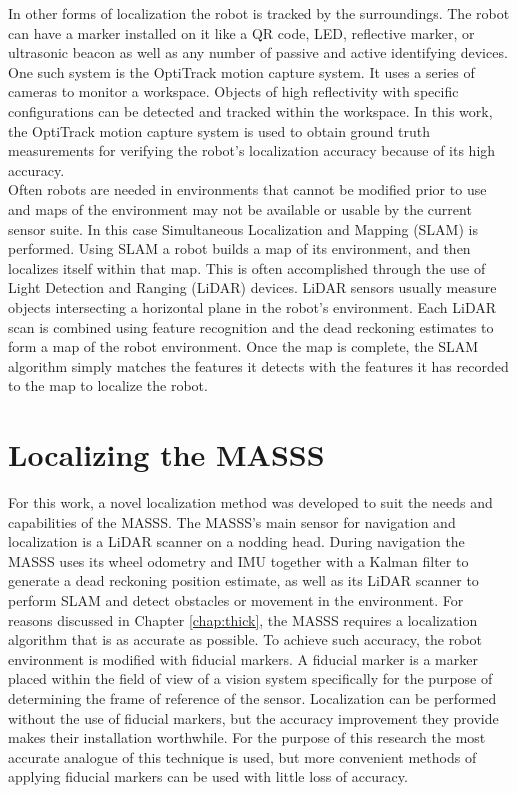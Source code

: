 In other forms of localization the robot is tracked by the surroundings. The robot can have a marker installed on it like a QR code, LED, reflective marker, or ultrasonic beacon as well as any number of passive and active identifying devices. One such system is the OptiTrack motion capture system. It uses a series of cameras to monitor a workspace. Objects of high reflectivity with specific configurations can be detected and tracked within the workspace. In this work, the OptiTrack motion capture system is used to obtain ground truth measurements for verifying the robot's localization accuracy because of its high accuracy.\\

Often robots are needed in environments that cannot be modified prior to use and maps of the environment may not be available or usable by the current sensor suite. In this case Simultaneous Localization and Mapping (SLAM) is performed. Using SLAM a robot builds a map of its environment, and then localizes itself within that map. This is often accomplished through the use of Light Detection and Ranging (LiDAR) devices. LiDAR sensors usually measure objects intersecting a horizontal plane in the robot's environment. Each LiDAR scan is combined using feature recognition and the dead reckoning estimates to form a map of the robot environment. Once the map is complete, the SLAM algorithm simply matches the features it detects with the features it has recorded to the map to localize the robot.\\

\section{Localizing the MASSS}

For this work, a novel localization method was developed to suit the needs and capabilities of the MASSS. The MASSS's main sensor for navigation and localization is a LiDAR scanner on a nodding head. During navigation the MASSS uses its wheel odometry and IMU together with a Kalman filter to generate a dead reckoning position estimate, as well as its LiDAR scanner to perform SLAM and detect obstacles or movement in the environment. For reasons discussed in Chapter \ref{chap:thick}, the MASSS requires a localization algorithm that is as accurate as possible. To achieve such accuracy, the robot environment is modified with fiducial markers. A fiducial marker is a marker placed within the field of view of a vision system specifically for the purpose of determining the frame of reference of the sensor. Localization can be performed without the use of fiducial markers, but the accuracy improvement they provide makes their installation worthwhile. For the purpose of this research the most accurate analogue of this technique is used, but more convenient methods of applying fiducial markers can be used with little loss of accuracy.\\

